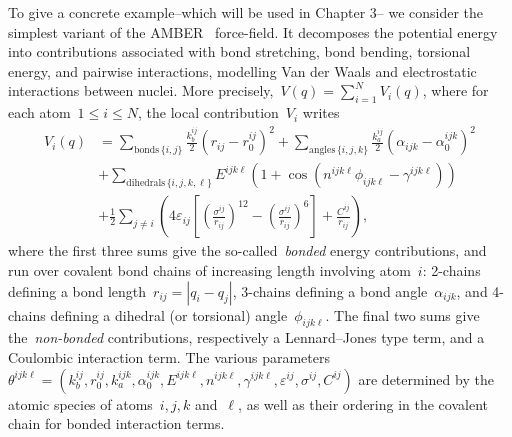 To give a concrete example--which will be used in Chapter 3-- we consider the simplest variant of the AMBER~\cite{PCCRCDFSK95} force-field. It decomposes the potential energy into contributions associated with bond stretching, bond bending, torsional energy, and pairwise interactions, modelling Van der Waals and electrostatic interactions between nuclei.
More precisely,~$V(q)=\sum_{i=1}^{N}V_i(q)$, where for each atom~$1\leq i\leq N$, the local contribution~$V_i$ writes
\begin{equation}
\begin{split}
    \label{eq:01:amber}
    V_i(q)&=\sum_{\text{bonds}\,\{i,j\}} \frac{k_b^{ij}}{2}(r_{ij}-r_0^{ij})^2 + \sum_{\text{angles}\,\{i,j,k\}} \frac{k_a^{ij}}{2}(\alpha_{ijk}-\alpha_0^{ijk})^2 \\
    &+ \sum_{\text{dihedrals}\,\{i,j,k,\ell\}} E^{ijk\ell}\left(1+\cos(n^{ijk\ell}\phi_{ijk\ell}-\gamma^{ijk\ell})\right) \\
    &+ \frac12\sum_{j\neq i}\left(4\varepsilon_{ij}\left[\left(\frac{\sigma^{ij}}{r_{ij}}\right)^{12}-\left(\frac{\sigma^{ij}}{r_{ij}}\right)^6\right] + \frac{C^{ij}}{r_{ij}}\right),
\end{split}
\end{equation}
where the first three sums give the so-called~\textit{bonded} energy contributions, and run over covalent bond chains of increasing length involving atom~$i$: 2-chains defining a bond length~$r_{ij}=|q_i-q_j|$, 3-chains defining a bond angle~$\alpha_{ijk}$, and 4-chains defining a dihedral (or torsional) angle~$\phi_{ijk\ell}$. The final two sums give the~\textit{non-bonded} contributions, respectively a Lennard--Jones type term, and a Coulombic interaction term. The various parameters~$\theta^{ijk\ell}=\left(k_b^{ij},r_0^{ij},k_a^{ijk},\alpha_0^{ijk},E^{ijk\ell},n^{ijk\ell},\gamma^{ijk\ell},\varepsilon^{ij},\sigma^{ij},C^{ij}\right)$ are determined by the atomic species of atoms~$i,j,k$ and~$\ell$, as well as their ordering in the covalent chain for bonded interaction terms.

